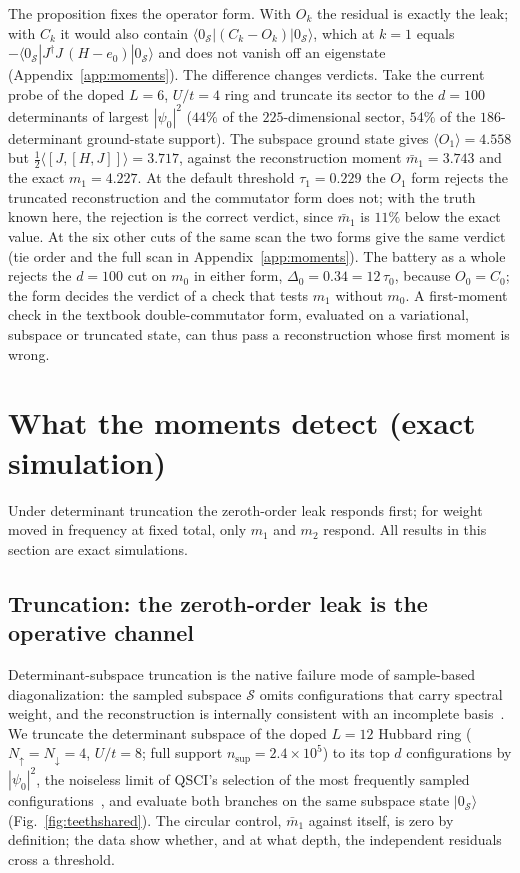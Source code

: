 \documentclass[submission, PhysCore]{SciPost}
\begin{document}
The proposition fixes the operator form. With $O_k$ the residual is exactly the leak; with $C_k$ it would also contain $\langle 0_\mathcal{S}|(C_k-O_k)|0_\mathcal{S}\rangle$, which at $k=1$ equals $-\langle 0_\mathcal S|J^\dagger J\,(H-e_0)|0_\mathcal S\rangle$ and does not vanish off an eigenstate (Appendix~\ref{app:moments}). The difference changes verdicts. Take the current probe of the doped $L=6$, $U/t=4$ ring and truncate its sector to the $d=100$ determinants of largest $|\psi_0|^2$ ($44\%$ of the $225$-dimensional sector, $54\%$ of the $186$-determinant ground-state support). The subspace ground state gives $\langle O_1\rangle=4.558$ but $\tfrac12\langle[J,[H,J]]\rangle=3.717$, against the reconstruction moment $\bar m_1=3.743$ and the exact $m_1=4.227$. At the default threshold $\tau_1=0.229$ the $O_1$ form rejects the truncated reconstruction and the commutator form does not; with the truth known here, the rejection is the correct verdict, since $\bar m_1$ is $11\%$ below the exact value. At the six other cuts of the same scan the two forms give the same verdict (tie order and the full scan in Appendix~\ref{app:moments}). The battery as a whole rejects the $d=100$ cut on $m_0$ in either form, $\Delta_0=0.34=12\,\tau_0$, because $O_0=C_0$; the form decides the verdict of a check that tests $m_1$ without $m_0$. A first-moment check in the textbook double-commutator form, evaluated on a variational, subspace or truncated state, can thus pass a reconstruction whose first moment is wrong.

\section{What the moments detect (exact simulation)}
\label{sec:detectsim}
\label{sec:teeth}
\label{sec:observables}
Under determinant truncation the zeroth-order leak responds first; for weight moved in frequency at fixed total, only $m_1$ and $m_2$ respond. All results in this section are exact simulations.

\subsection{Truncation: the zeroth-order leak is the operative channel}
Determinant-subspace truncation is the native failure mode of sample-based diagonalization: the sampled subspace $\mathcal S$ omits configurations that carry spectral weight, and the reconstruction is internally consistent with an incomplete basis~\cite{SQDchem2025,QSCI2023}. We truncate the determinant subspace of the doped $L=12$ Hubbard ring ($N_\uparrow=N_\downarrow=4$, $U/t=8$; full support $n_{\mathrm{sup}}=2.4\times10^5$) to its top $d$ configurations by $|\psi_0|^2$, the noiseless limit of QSCI's selection of the most frequently sampled configurations~\cite{QSCI2023}, and evaluate both branches on the same subspace state $|0_\mathcal{S}\rangle$ (Fig.~\ref{fig:teethshared}). The circular control, $\bar m_1$ against itself, is zero by definition; the data show whether, and at what depth, the independent residuals cross a threshold.
\end{document}
